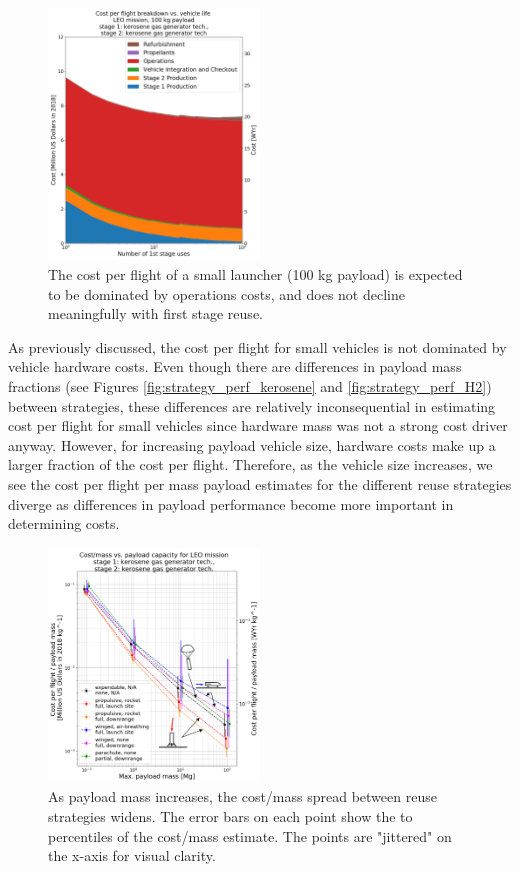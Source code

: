 \documentclass[conf]{new-aiaa}
\begin{document}
\begin{multicols}{2}
\begin{figure}[H]
    \centering
    \includegraphics[width=0.5\textwidth]{../../lvreuse/analysis/combined/plots/cpf_stackplot_reuses_sweep_small_sat}
    \caption{\label{fig:cpf_stackplot_reuses_sweep_small_sat} The cost per flight of a small launcher (100 kg payload) is expected to be dominated by operations costs, and does not decline meaningfully with first stage reuse.}
\end{figure}


As previously discussed, the cost per flight for small vehicles is not dominated by vehicle hardware costs. Even though there are differences in payload mass fractions (see Figures \ref{fig:strategy_perf_kerosene} and \ref{fig:strategy_perf_H2}) between strategies, these differences are relatively inconsequential in estimating cost per flight for small vehicles since hardware mass was not a strong cost driver anyway. However, for increasing payload vehicle size, hardware costs make up a larger fraction of the cost per flight. Therefore, as the vehicle size increases, we see the cost per flight per mass payload estimates for the different reuse strategies diverge as differences in payload performance become more important in determining costs. 

\begin{figure}[H]
    \centering
    \includegraphics[width=0.5\textwidth]{m_payload_sweep_LEO_kerosene_annotated}
    \caption{\label{fig:m_payload_sweep_LEO_kerosene} As payload mass increases, the cost/mass spread between reuse strategies widens. The error bars on each point show the  to  percentiles of the cost/mass estimate. The points are "jittered" on the x-axis for visual clarity.}
\end{figure}


\end{multicols}
\end{document}
